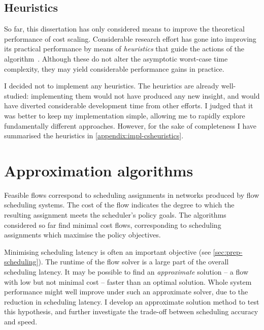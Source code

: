 \subsection{Heuristics}

So far, this dissertation has only considered means to improve the theoretical performance of cost scaling. Considerable research effort has gone into improving its practical performance by means of \emph{heuristics} that guide the actions of the algorithm~\cite{Goldberg:1997}. Although these do not alter the asymptotic worst-case time complexity, they may yield considerable performance gains in practice.

I decided not to implement any heuristics. The heuristics are already well-studied: implementing them would not have produced any new insight, and would have diverted considerable development time from other efforts. I judged that it was better to keep my implementation simple, allowing me to rapidly explore fundamentally different approaches. However, for the sake of completeness I have summarised the heuristics in \cref{appendix:impl-csheuristics}.


\section{Approximation algorithms} \label{sec:impl-approx}



Feasible flows correspond to scheduling assignments in networks produced by flow scheduling systems. The cost of the flow indicates the degree to which the resulting assignment meets the scheduler's policy goals. The algorithms considered so far find minimal cost flows, corresponding to scheduling assignments which maximise the policy objectives.

Minimising scheduling latency is often an important objective (see \cref{sec:prep-scheduling}). The runtime of the flow solver is a large part of the overall scheduling latency. It may be possible to find an \emph{approximate} solution -- a flow with low but not minimal cost -- faster than an optimal solution. Whole system performance might well improve under such an approximate solver, due to the reduction in scheduling latency. I develop an approximate solution method to test this hypothesis, and further investigate the trade-off between scheduling accuracy and speed.

